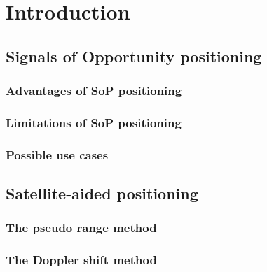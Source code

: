 \chapter{Introduction}

\section{Signals of Opportunity positioning}

\subsection{Advantages of SoP positioning}

\subsection{Limitations of SoP positioning}

\subsection{Possible use cases}

\section{Satellite-aided positioning}
\label{s_int_sat_aided_pos}

\subsection{The pseudo range method}

\subsection{The Doppler shift method}
\label{s_int_doppler_shift_method}
